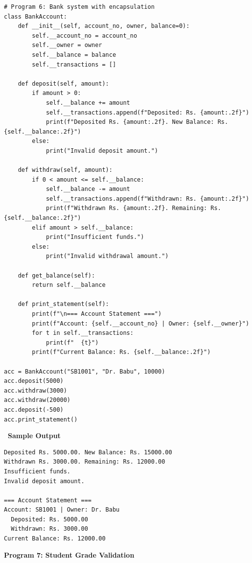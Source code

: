 \documentclass[12pt,a4paper]{article}
\newcommand{\outhead}{\noindent\colorbox{cmrgreen!25}%
  {\textbf{\small\color{cmrdark}~Sample Output~}}\par\vspace{-1pt}}
\begin{document}
\begin{lstlisting}
# Program 6: Bank system with encapsulation
class BankAccount:
    def __init__(self, account_no, owner, balance=0):
        self.__account_no = account_no
        self.__owner = owner
        self.__balance = balance
        self.__transactions = []

    def deposit(self, amount):
        if amount > 0:
            self.__balance += amount
            self.__transactions.append(f"Deposited: Rs. {amount:.2f}")
            print(f"Deposited Rs. {amount:.2f}. New Balance: Rs. {self.__balance:.2f}")
        else:
            print("Invalid deposit amount.")

    def withdraw(self, amount):
        if 0 < amount <= self.__balance:
            self.__balance -= amount
            self.__transactions.append(f"Withdrawn: Rs. {amount:.2f}")
            print(f"Withdrawn Rs. {amount:.2f}. Remaining: Rs. {self.__balance:.2f}")
        elif amount > self.__balance:
            print("Insufficient funds.")
        else:
            print("Invalid withdrawal amount.")

    def get_balance(self):
        return self.__balance

    def print_statement(self):
        print(f"\n=== Account Statement ===")
        print(f"Account: {self.__account_no} | Owner: {self.__owner}")
        for t in self.__transactions:
            print(f"  {t}")
        print(f"Current Balance: Rs. {self.__balance:.2f}")

acc = BankAccount("SB1001", "Dr. Babu", 10000)
acc.deposit(5000)
acc.withdraw(3000)
acc.withdraw(20000)
acc.deposit(-500)
acc.print_statement()
\end{lstlisting}

\outhead
\begin{lstlisting}[style=outputstyle]
Deposited Rs. 5000.00. New Balance: Rs. 15000.00
Withdrawn Rs. 3000.00. Remaining: Rs. 12000.00
Insufficient funds.
Invalid deposit amount.

=== Account Statement ===
Account: SB1001 | Owner: Dr. Babu
  Deposited: Rs. 5000.00
  Withdrawn: Rs. 3000.00
Current Balance: Rs. 12000.00
\end{lstlisting}

\vspace{0.5cm}

\textbf{Program 7: Student Grade Validation}
\end{document}
